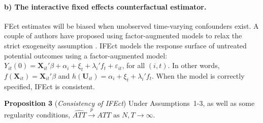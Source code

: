 \documentclass[12pt]{article}
\let\oldcenter\center
\let\oldendcenter\endcenter
\renewenvironment{center}{\setlength\topsep{0pt}\oldcenter}{\oldendcenter}
\begin{document}
\medskip\paragraph{b) The interactive fixed effects counterfactual estimator.} FEct estimates will be biased when unobserved time-varying confounders exist. A couple of authors have proposed using factor-augmented models to relax the strict exogeneity assumption \citep{Bai2009,GobillonMagnac2016,xu2017generalized,BaiNg2020}. IFEct models the response surface of untreated potential outcomes using a factor-augmented model:
\begin{center}
  $Y_{it}(0) = \mathbf{X}_{it}'\beta + \alpha_{i} + \xi_{t} + \lambda_{i}'f_{t} + \varepsilon_{it}$, for all $(i, t)$.
\end{center}
\medskip\noindent In other words, $f(\mathbf{X}_{it}) =  \mathbf{X}_{it}'\beta$ and $h(\mathbf{U}_{it}) = \alpha_{i} + \xi_{t} + \lambda_{i}'f_{t}$. When the model is correctly specified, IFEct is consistent. 

\medskip\noindent\textbf{Proposition 3} ({\it Consistency of IFEct}) Under Assumptions~1-3, as well as some regularity conditions, $\widehat{ATT} \overset{p}{\to}  ATT \text{ as } N, T\to\infty.$
\end{document}
